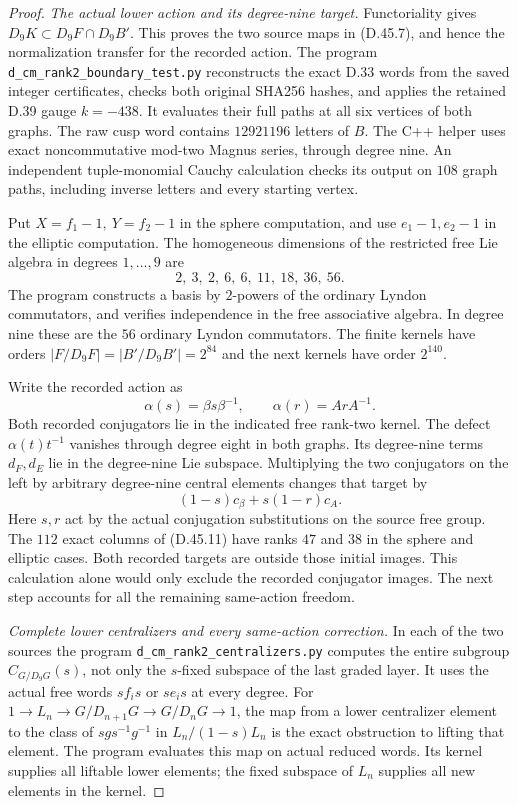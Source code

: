 \begin{proof}
\emph{The actual lower action and its degree-nine target.}
Functoriality gives
\(D_9K\subset D_9F\cap D_9B'\).
This proves the two source maps
in (D.45.7), and hence the
normalization transfer for the
recorded action. The program
\texttt{d\_cm\_rank2\_boundary\_test.py}
reconstructs the exact D.33 words
from the saved integer certificates,
checks both original SHA256 hashes,
and applies the retained D.39 gauge
\(k=-438\). It evaluates their
full paths at all six vertices
of both graphs. The raw cusp
word contains \(12921196\)
letters of \(B\).
The C++ helper uses exact
noncommutative mod-two Magnus
series, through degree nine.
An independent tuple-monomial
Cauchy calculation checks
its output on \(108\) graph
paths, including inverse
letters and every starting
vertex.

Put \(X=f_1-1,\ Y=f_2-1\)
in the sphere computation,
and use \(e_1-1,e_2-1\)
in the elliptic computation.
The homogeneous dimensions
of the restricted free Lie
algebra in degrees \(1,\ldots,9\)
are
\[
                2,\ 3,\ 2,\ 6,\ 6,\ 11,\ 18,\ 36,\ 56.        \tag{D.45.10}
\]
The program constructs a basis
by \(2\)-powers of the ordinary
Lyndon commutators, and verifies
independence in the free
associative algebra. In degree
nine these are the \(56\)
ordinary Lyndon commutators.
The finite kernels have orders
\(\lvert F/D_9F\rvert
=\lvert B'/D_9B'\rvert=2^{84}\)
and the next kernels have
order \(2^{140}\).

Write the recorded action as
\[
 \alpha(s)=\beta s\beta^{-1},\qquad
 \alpha(r)=A rA^{-1}.
\]
Both recorded conjugators lie
in the indicated free rank-two
kernel. The defect
\(\alpha(t)t^{-1}\) vanishes
through degree eight in both
graphs. Its degree-nine terms
\(d_F,d_E\) lie in the
degree-nine Lie subspace.
Multiplying the two conjugators
on the left by arbitrary
degree-nine central elements
changes that target by
\[
       (1-s)c_\beta+s(1-r)c_A.                                 \tag{D.45.11}
\]
Here \(s,r\) act by the actual
conjugation substitutions on
the source free group.
The \(112\) exact columns
of (D.45.11) have ranks
\(47\) and \(38\) in the
sphere and elliptic cases.
Both recorded targets are
outside those initial images.
This calculation alone would
only exclude the recorded
conjugator images. The next
step accounts for all the
remaining same-action freedom.

\emph{Complete lower centralizers and every same-action correction.}
In each of the two sources
the program
\texttt{d\_cm\_rank2\_centralizers.py}
computes the entire subgroup
\(C_{G/D_9G}(s)\), not only
the \(s\)-fixed subspace of
the last graded layer.
It uses the actual free
words \(s f_i s\) or
\(s e_i s\) at every degree.
For
\(1\to L_n\to G/D_{n+1}G
\to G/D_nG\to1\),
the map from a lower
centralizer element to the
class of \(s g s^{-1}g^{-1}\)
in \(L_n/(1-s)L_n\)
is the exact obstruction
to lifting that element.
The program evaluates this
map on actual reduced words.
Its kernel supplies all
liftable lower elements;
the fixed subspace of
\(L_n\) supplies all new
elements in the kernel.


\end{proof}
